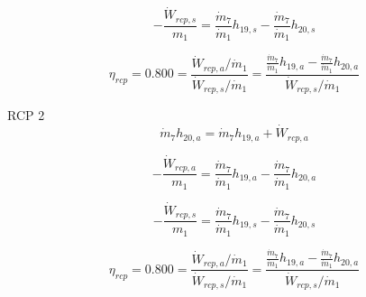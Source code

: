 \documentclass{article}
\begin{document}
\begin{equation}
-\frac{\dot{W}_{rcp,s}}{m_1} = \frac{\dot{m}_{ 7}}{\dot{m}_{ 1}}h_{19,s} - \frac{\dot{m}_{ 7}}{\dot{m}_{ 1}}h_{20,s}\end{equation}

\begin{equation}
\eta_{rcp} =    0.800 = \frac{\dot{W}_{rcp,a} / \dot{m}_{1}}{\dot{W}_{rcp,s} / \dot{m}_{1}} = \frac{
\frac{\dot{m}_{ 7}}{\dot{m}_{ 1}}h_{19,a} - \frac{\dot{m}_{ 7}}{\dot{m}_{ 1}}h_{20,a}}{\dot{W}_{rcp,s} / \dot{m}_{1}}
\end{equation}


RCP 2
\begin{equation}
\dot{m}_{ 7}h_{20,a} = \dot{m}_{ 7}h_{19,a} + \dot{W}_{rcp,a}
\end{equation}

\begin{equation}
-\frac{\dot{W}_{rcp,a}}{m_1} = \frac{\dot{m}_{ 7}}{\dot{m}_{ 1}}h_{19,a} - \frac{\dot{m}_{ 7}}{\dot{m}_{ 1}}h_{20,a}\end{equation}

\begin{equation}
-\frac{\dot{W}_{rcp,s}}{m_1} = \frac{\dot{m}_{ 7}}{\dot{m}_{ 1}}h_{19,s} - \frac{\dot{m}_{ 7}}{\dot{m}_{ 1}}h_{20,s}\end{equation}

\begin{equation}
\eta_{rcp} =    0.800 = \frac{\dot{W}_{rcp,a} / \dot{m}_{1}}{\dot{W}_{rcp,s} / \dot{m}_{1}} = \frac{
\frac{\dot{m}_{ 7}}{\dot{m}_{ 1}}h_{19,a} - \frac{\dot{m}_{ 7}}{\dot{m}_{ 1}}h_{20,a}}{\dot{W}_{rcp,s} / \dot{m}_{1}}
\end{equation}
\end{document}
